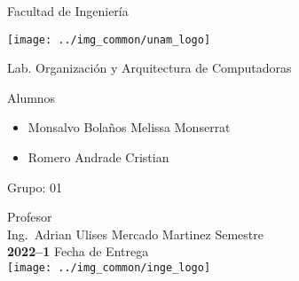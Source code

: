 \begin{titlepage}
  \centering

    {\scshape{\Huge Facultad de Ingeniería\par{}}}\vspace{0.25cm}

    \texttt{[image: ../img\_common/unam\_logo]}\vspace{0.5cm}

    {\scshape{\Large Lab. Organización y Arquitectura de Computadoras\par{}}}\vfill{}


    {\huge \textbf{\tituloTrabajo{}}}\vfill{}


    {\Large
      Alumnos
      \begin{itemize}

        \item Monsalvo Bolaños Melissa Monserrat

        \item Romero Andrade Cristian
      \end{itemize}
    }\vfill{}

      {\large Grupo: 01\par{}}\vfill{}

    {\large Profesor\\Ing.~Adrian Ulises Mercado Martinez}\vfill{}
    \vfil{}
    {\large Semestre\\\textbf{2022--1}}
    \vfill{}
    {\large Fecha de Entrega\\\fechaEntrega}
    \vfill{}
    \texttt{[image: ../img\_common/inge\_logo]}

\end{titlepage}
